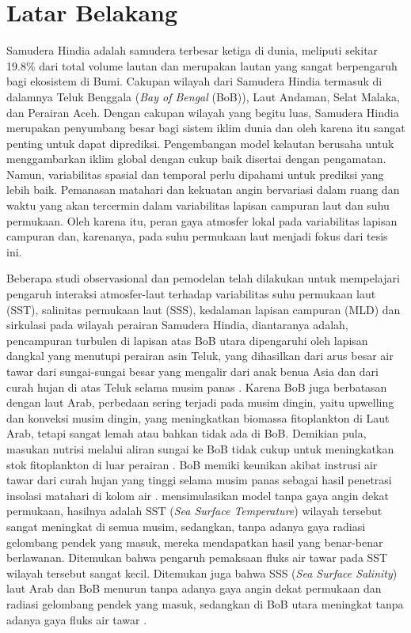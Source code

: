 \vspace{1.5pc}
\section[Latar Belakang]{Latar Belakang}
\begin{spacing}{1.5}
	Samudera Hindia adalah samudera terbesar ketiga di dunia, meliputi sekitar 19.8\% dari total volume lautan  dan merupakan lautan yang sangat berpengaruh bagi ekosistem di Bumi. Cakupan wilayah dari Samudera Hindia termasuk di dalamnya Teluk Benggala (\textit{Bay of Bengal} (BoB)), Laut Andaman, Selat Malaka, dan Perairan Aceh. Dengan cakupan wilayah yang begitu luas, Samudera Hindia merupakan penyumbang besar bagi sistem iklim dunia dan oleh karena itu sangat penting untuk dapat diprediksi. Pengembangan model kelautan berusaha untuk menggambarkan iklim global dengan cukup baik disertai dengan pengamatan. Namun, variabilitas spasial dan temporal perlu dipahami untuk prediksi yang lebih baik. Pemanasan matahari dan kekuatan angin bervariasi dalam ruang dan waktu yang akan tercermin dalam variabilitas lapisan campuran laut dan suhu permukaan. Oleh karena itu, peran gaya atmosfer lokal pada variabilitas lapisan campuran dan, karenanya, pada suhu permukaan laut menjadi fokus dari tesis ini.
	
	Beberapa studi observasional dan pemodelan telah dilakukan untuk mempelajari pengaruh interaksi atmosfer-laut terhadap variabilitas suhu permukaan laut (SST), salinitas permukaan laut (SSS), kedalaman lapisan campuran (MLD) dan sirkulasi pada wilayah perairan Samudera Hindia, diantaranya adalah,	pencampuran turbulen di lapisan atas BoB utara dipengaruhi oleh lapisan dangkal yang menutupi perairan asin Teluk, yang dihasilkan dari arus besar air tawar dari sungai-sungai besar yang mengalir dari anak benua Asia dan dari curah hujan di atas Teluk selama musim panas . Karena BoB juga berbatasan dengan laut Arab, perbedaan sering terjadi pada musim dingin, yaitu upwelling dan konveksi musim dingin, yang meningkatkan biomassa fitoplankton di Laut Arab, tetapi sangat lemah atau bahkan tidak ada di BoB. Demikian pula, masukan nutrisi melalui aliran sungai ke BoB tidak cukup untuk meningkatkan stok fitoplankton di luar perairan . BoB memiki keunikan akibat instrusi air tawar dari curah hujan yang tinggi selama musim panas sebagai hasil penetrasi insolasi matahari di kolom air \cite{Kantha2019}.  mensimulasikan model tanpa gaya angin dekat permukaan, hasilnya adalah SST (\textit{Sea Surface Temperature}) wilayah tersebut sangat meningkat di semua musim, sedangkan, tanpa adanya gaya radiasi gelombang pendek yang masuk, mereka mendapatkan hasil yang benar-benar berlawanan. Ditemukan bahwa pengaruh pemaksaan fluks air tawar pada SST wilayah tersebut sangat kecil. Ditemukan juga bahwa SSS (\textit{Sea Surface Salinity}) laut Arab dan BoB menurun tanpa adanya gaya angin dekat permukaan dan radiasi gelombang pendek yang masuk, sedangkan di BoB utara meningkat tanpa adanya gaya fluks air tawar .
	

\end{spacing}
